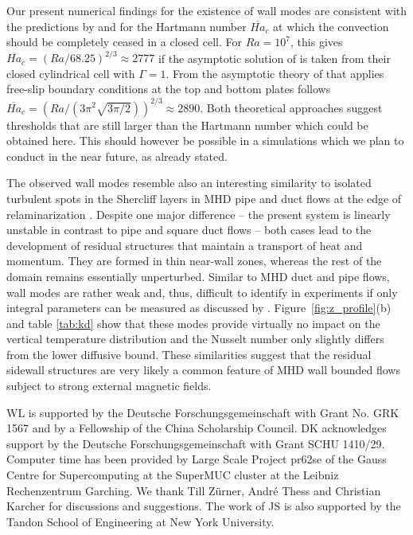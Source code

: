 \documentclass{jfm}
\begin{document}
Our present numerical findings for the existence of wall modes are consistent with the predictions by \cite{Houchens2002} and \cite{Busse2008} for the 
Hartmann number $\overline{Ha}_c$ at which the convection should be completely ceased in a closed cell. For $Ra=10^7$, this gives $\overline{Ha}_c=(Ra/68.25)^{2/3}\approx 2777$ if the asymptotic solution of \cite{Houchens2002} is taken from their closed cylindrical cell with $\Gamma=1$. From the 
asymptotic theory of \cite{Busse2008} that applies free-slip boundary conditions at the top and bottom plates follows $\overline{Ha}_c=(Ra/(3\pi^2\sqrt{3\pi/2}))^{2/3}\approx 2890$. Both theoretical approaches suggest thresholds that are still larger than the Hartmann number which could be obtained here. 
This should however be possible in a simulations which we plan to conduct in the near future, as already stated.       

The observed wall modes resemble also an interesting similarity to isolated turbulent spots in the Shercliff layers in MHD pipe 
and duct flows at the edge of relaminarization \cite[]{Krasnov:2013,ZikanovASME:2014}. Despite one major difference -- the present system 
is linearly unstable in contrast to pipe and square duct flows -- both cases lead to the development of residual structures that maintain a transport of heat and momentum.
They are formed in thin near-wall zones, whereas the rest of the domain remains essentially unperturbed.
Similar to MHD duct and pipe flows, wall modes are rather weak and, thus, difficult to identify in experiments if only integral parameters can be 
measured as discussed by \cite{Krasnov:2013}.  Figure~\ref{fig:z_profile}(b) and table \ref{tab:kd} show that these modes provide virtually
no impact on the vertical temperature distribution and the Nusselt number only slightly differs from the lower diffusive bound. These similarities 
suggest that the residual sidewall structures are very likely a common feature of MHD wall bounded flows subject to strong external magnetic fields.


\vspace{0.3cm}
WL is supported by the Deutsche Forschungsgemeinschaft with Grant No. GRK 1567 and by a Fellowship of the China Scholarship Council.
DK acknowledges support by the Deutsche Forschungsgemeinschaft with Grant SCHU 1410/29. 
Computer time has been provided by Large Scale Project pr62se of the Gauss Centre for Supercomputing at the SuperMUC cluster at the 
Leibniz Rechenzentrum Garching. We thank Till Z\"urner,  Andr\'{e} Thess and Christian Karcher for discussions and suggestions. The work 
of JS is also supported by the Tandon School of Engineering at New York University.





\end{document}
